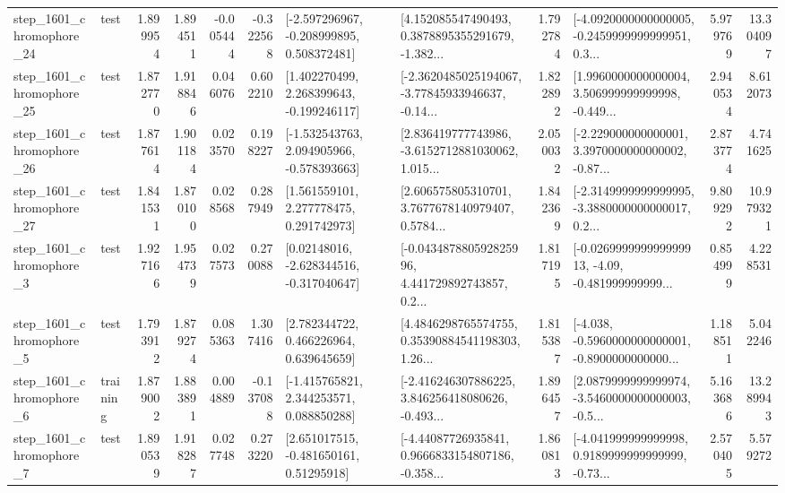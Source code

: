 \begin{tabular}{llrrrrllrlrr}
 step\_1601\_chromophore\_24 &      test &      1.899954 &    1.894511 &     -0.005444 & -0.322568 &   [-2.597296967, -0.208999895, 0.508372481] &  [4.152085547490493, 0.3878895355291679, -1.382... &       1.792784 &  [-4.0920000000000005, -0.2459999999999951, 0.3... &            5.979769 &         13.304097 \\
 step\_1601\_chromophore\_25 &      test &      1.872770 &    1.918846 &      0.046076 &  0.602210 &    [1.402270499, 2.268399643, -0.199246117] &  [-2.3620485025194067, -3.77845933946637, -0.14... &       1.822892 &  [1.9960000000000004, 3.506999999999998, -0.449... &            2.940534 &          8.612073 \\
 step\_1601\_chromophore\_26 &      test &      1.877614 &    1.901184 &      0.023570 &  0.198227 &   [-1.532543763, 2.094905966, -0.578393663] &  [2.836419777743986, -3.6152712881030062, 1.015... &       2.050032 &  [-2.229000000000001, 3.3970000000000002, -0.87... &            2.873774 &          4.741625 \\
 step\_1601\_chromophore\_27 &      test &      1.841531 &    1.870100 &      0.028568 &  0.287949 &     [1.561559101, 2.277778475, 0.291742973] &  [2.606575805310701, 3.7677678140979407, 0.5784... &       1.842369 &  [-2.3149999999999995, -3.3880000000000017, 0.2... &            9.809292 &         10.979321 \\
  step\_1601\_chromophore\_3 &      test &      1.927166 &    1.954739 &      0.027573 &  0.270088 &    [0.02148016, -2.628344516, -0.317040647] &  [-0.043487880592825996, 4.441729892743857, 0.2... &       1.817195 &  [-0.026999999999999913, -4.09, -0.481999999999... &            0.854999 &          4.228531 \\
  step\_1601\_chromophore\_5 &      test &      1.793912 &    1.879274 &      0.085363 &  1.307416 &     [2.782344722, 0.466226964, 0.639645659] &  [4.4846298765574755, 0.35390884541198303, 1.26... &       1.815387 &  [-4.038, -0.5960000000000001, -0.8900000000000... &            1.188511 &          5.042246 \\
  step\_1601\_chromophore\_6 &  training &      1.879002 &    1.883891 &      0.004889 & -0.137088 &    [-1.415765821, 2.344253571, 0.088850288] &  [-2.416246307886225, 3.846256418080626, -0.493... &       1.896457 &  [2.0879999999999974, -3.5460000000000003, -0.5... &            5.163686 &         13.289943 \\
  step\_1601\_chromophore\_7 &      test &      1.890539 &    1.918287 &      0.027748 &  0.273220 &     [2.651017515, -0.481650161, 0.51295918] &  [-4.44087726935841, 0.9666833154807186, -0.358... &       1.860813 &  [-4.041999999999998, 0.9189999999999999, -0.73... &            2.570405 &          5.579272 \\

\end{tabular}
